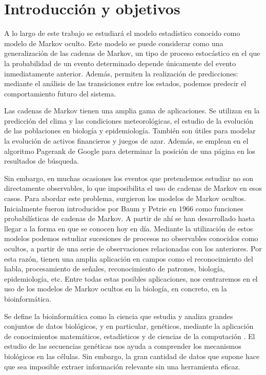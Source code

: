 \chapter*{Introducción y objetivos}

A lo largo de este trabajo se estudiará el modelo estadístico conocido como modelo de Markov oculto. Este modelo se puede considerar como una generalización de las cadenas de Markov, un tipo de proceso estocástico en el que la probabilidad de un evento determinado depende únicamente del evento inmediatamente anterior. Además, permiten la realización de predicciones: mediante el análisis de las transiciones entre los estados, podemos predecir el comportamiento futuro del sistema. 

Las cadenas de Markov tienen una amplia gama de aplicaciones. Se utilizan en la predicción del clima y las condiciones meteorológicas, el estudio de la evolución de las poblaciones en biología y epidemiología. También son útiles para modelar la evolución de activos financieros y juegos de azar. Además, se emplean en el algoritmo Pagerank de Google para determinar la posición de una página en los resultados de búsqueda.

Sin embargo, en muchas ocasiones los eventos que pretendemos estudiar no son directamente observables, lo que imposibilita el uso de cadenas de Markov en esos casos. Para abordar este problema, surgieron los modelos de Markov ocultos. Inicialmente fueron introducidos por Baum y Petrie en 1966 \cite{Baum} como funciones probabilísticas de cadenas de Markov. A partir de ahí se han desarrollado hasta llegar a la forma en que se conocen hoy en día. Mediante la utilización de estos modelos podemos estudiar sucesiones de procesos no observables conocidos como ocultos, a partir de una serie de observaciones relacionadas con los anteriores. Por esta razón, tienen una amplia aplicación en campos como el reconocimiento del habla, procesamiento de señales, reconocimiento de patrones, biología, epidemiología, etc. Entre todas estas posibles aplicaciones, nos centraremos en el uso de los modelos de Markov ocultos en la biología, en concreto, en la bioinformática. 

Se define la bioinformática como la ciencia que estudia y analiza grandes conjuntos de datos biológicos, y en particular, genéticos, mediante la aplicación de conocimientos matemáticos, estadísticos y de ciencias de la computación \cite{Warren}. El estudio de las secuencias genéticas nos ayuda a comprender los mecanismos biológicos en las células. Sin embargo, la gran cantidad de datos que supone hace que sea imposible extraer información relevante sin una herramienta eficaz. 

